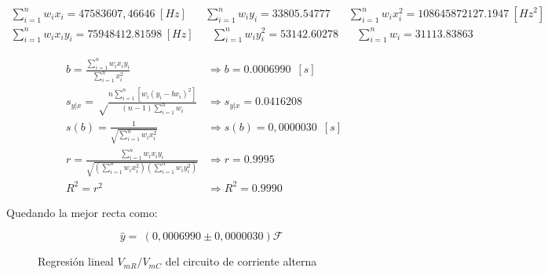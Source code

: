 \documentclass[11pt]{report}
\begin{document}
\begin{refsection}
\begin{center}
\begin{equation}
\begin{split}
    \sum^n_{i=1} w_i x_i = 47583607,46646 \hspace{3pt}[Hz] \hspace{20pt}
    \sum^n_{i=1} w_i y_i = 33805.54777 \hspace{20pt}
    \sum^n_{i=1} w_i x_i^2 = 108645872127.1947 \hspace{3pt} [{Hz}^2]\\
    \sum^n_{i=1} w_i x_i y_i = 75948412.81598 \hspace{3pt} [Hz] \hspace{20pt}
    \sum^n_{i=1} w_i y_i^2 = 53142.60278  \hspace{20pt}
    \sum^n_{i=1} w_i=31113.83863
    \label{eq:sumx4}
\end{split}
\end{equation}
\end{center}
\bigskip
\begin{center}
\begin{align}
    b = \frac{\sum^n_{i=1} w_i x_i y_i}{\sum^n_{i=1} x_i^2} &\Rightarrow b= 0.0006990 \hspace{6pt}[s] \label{eq:b4}\\
    s_{y|x} =\sqrt\frac{n \sum^n_{i=1}[w_i (y_i-b x_i)^2]}{(n-1)\sum^n_{i=1} w_i} &\Rightarrow s_{y|x}= 0.0416208 \hspace{6pt} \label{eq:s4}\\
    s(b) =\frac{1}{\sqrt{\sum^n_{i=1} w_i x_i^2}} &\Rightarrow s(b)= 0,0000030 \hspace{6pt}[s] \label{eq:s4b}\\
    r = \frac{\sum^n_{i=1} w_i x_i y_i}{\sqrt{(\sum^n_{i=1} w_i x_i^2)(\sum^n_{i=1} w_i y_i^2)}}&\Rightarrow r= 0.9995 \label{eq:R4}\\
    R^2 =r^2&\Rightarrow R^2=0.9990 \label{eq:R24}
\end{align}
\end{center}

Quedando la mejor recta como:

\begin{equation}
    \hat{y}=\hspace{3pt}(0,0006990 \pm 0,0000030)\mathscr{F} \hspace{6pt}
\end{equation}

\begin{figure}[H]
    \begin{center}
        
    \end{center}
    \caption{Regresión lineal $V_{mR}/V_{mC}$ del circuito de corriente alterna}
    \label{fig:rlca}
\end{figure}


\end{refsection}
\end{document}
